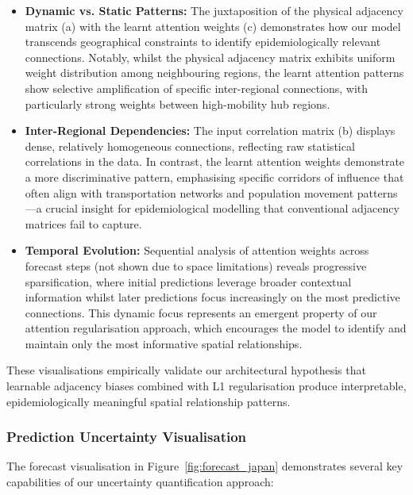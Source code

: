 \documentclass[lettersize, journal]{IEEEtran}
\begin{document}
\begin{itemize}
    \item \textbf{Dynamic vs. Static Patterns:} The juxtaposition of the physical adjacency matrix (a) with the learnt attention weights (c) demonstrates how our model transcends geographical constraints to identify epidemiologically relevant connections. Notably, whilst the physical adjacency matrix exhibits uniform weight distribution among neighbouring regions, the learnt attention patterns show selective amplification of specific inter-regional connections, with particularly strong weights between high-mobility hub regions.
    
    \item \textbf{Inter-Regional Dependencies:} The input correlation matrix (b) displays dense, relatively homogeneous connections, reflecting raw statistical correlations in the data. In contrast, the learnt attention weights demonstrate a more discriminative pattern, emphasising specific corridors of influence that often align with transportation networks and population movement patterns—a crucial insight for epidemiological modelling that conventional adjacency matrices fail to capture.
    
    \item \textbf{Temporal Evolution:} Sequential analysis of attention weights across forecast steps (not shown due to space limitations) reveals progressive sparsification, where initial predictions leverage broader contextual information whilst later predictions focus increasingly on the most predictive connections. This dynamic focus represents an emergent property of our attention regularisation approach, which encourages the model to identify and maintain only the most informative spatial relationships.
\end{itemize}

These visualisations empirically validate our architectural hypothesis that learnable adjacency biases combined with L1 regularisation produce interpretable, epidemiologically meaningful spatial relationship patterns.

\subsubsection{Prediction Uncertainty Visualisation}
The forecast visualisation in Figure~\ref{fig:forecast_japan} demonstrates several key capabilities of our uncertainty quantification approach:
\end{document}
